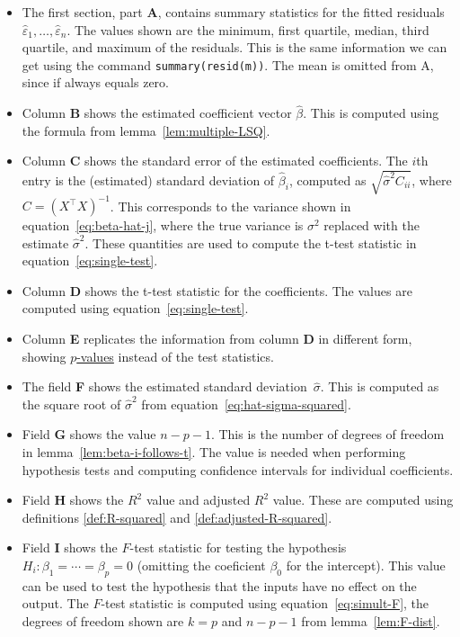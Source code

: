 \documentclass[
  a4paper,
]{article}
\theoremstyle{definition}
\theoremstyle{definition}
\theoremstyle{definition}
\theoremstyle{definition}
\theoremstyle{remark}
\begin{document}
\begin{itemize}
\item
  The first section, part \textbf{A}, contains summary statistics for the
  fitted residuals \(\hat\varepsilon_1, \ldots, \hat\varepsilon_n\). The values
  shown are the minimum, first quartile, median, third quartile,
  and maximum of the residuals. This is the same information
  we can get using the command \texttt{summary(resid(m))}.
  The mean is omitted from A, since if always equals zero.
\item
  Column \textbf{B} shows the estimated coefficient vector \(\hat\beta\).
  This is computed using the formula from lemma~\ref{lem:multiple-LSQ}.
\item
  Column \textbf{C} shows the standard error of the estimated coefficients.
  The \(i\)th entry is the (estimated) standard deviation of \(\hat\beta_i\),
  computed as \(\sqrt{\hat\sigma^2 C_{ii}}\), where \(C = (X^\top X)^{-1}\).
  This corresponds to the variance shown in equation~\eqref{eq:beta-hat-j},
  where the true variance is \(\sigma^2\) replaced with the estimate \(\hat\sigma^2\).
  These quantities are used to compute the t-test statistic in
  equation~\eqref{eq:single-test}.
\item
  Column \textbf{D} shows the t-test statistic for the coefficients.
  The values are computed using equation~\eqref{eq:single-test}.
\item
  Column \textbf{E} replicates the information from column \textbf{D} in different form,
  showing \href{https://en.wikipedia.org/wiki/P-value}{\(p\)-values} instead of the
  test statistics.
\item
  The field \textbf{F} shows the estimated standard deviation~\(\hat\sigma\).
  This is computed as the square root of \(\hat\sigma^2\) from
  equation~\eqref{eq:hat-sigma-squared}.
\item
  Field \textbf{G} shows the value \(n - p - 1\). This is the number of degrees
  of freedom in lemma~\ref{lem:beta-i-follows-t}. The value is needed
  when performing hypothesis tests and computing confidence intervals
  for individual coefficients.
\item
  Field \textbf{H} shows the \(R^2\) value and adjusted \(R^2\) value. These are
  computed using definitions \ref{def:R-squared} and \ref{def:adjusted-R-squared}.
\item
  Field \textbf{I} shows the \(F\)-test statistic for testing the hypothesis
  \(H_i\colon \beta_1 = \cdots = \beta_p = 0\) (omitting the coeficient
  \(\beta_0\) for the intercept). This value can be used to test the hypothesis
  that the inputs have no effect on the output.
  The \(F\)-test statistic is computed using equation~\eqref{eq:simult-F},
  the degrees of freedom shown are \(k = p\) and \(n - p - 1\)
  from lemma~\ref{lem:F-dist}.
\end{itemize}
\end{document}
